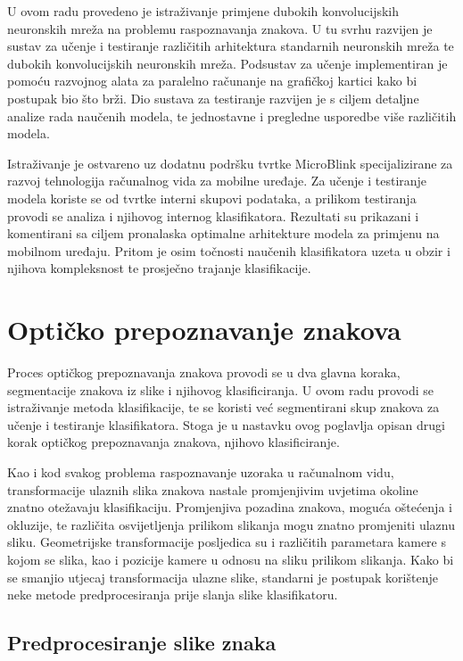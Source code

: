 \documentclass[lmodern, utf8, diplomski, numeric]{fer}
\begin{document}
U ovom radu provedeno je istraživanje primjene dubokih konvolucijskih neuronskih mreža na problemu raspoznavanja znakova. U tu svrhu razvijen je sustav za učenje i testiranje različitih arhitektura standarnih neuronskih mreža te dubokih konvolucijskih neuronskih mreža. Podsustav za učenje implementiran je pomoću razvojnog alata za paralelno računanje na grafičkoj kartici kako bi postupak bio što brži. Dio sustava za testiranje razvijen je s ciljem detaljne analize rada naučenih modela, te jednostavne i pregledne usporedbe više različitih modela. 

Istraživanje je ostvareno uz dodatnu podršku tvrtke MicroBlink specijalizirane za razvoj tehnologija računalnog vida za mobilne uređaje. Za učenje i testiranje modela koriste se od tvrtke interni skupovi podataka, a prilikom testiranja provodi se analiza i njihovog internog klasifikatora. 
Rezultati su prikazani i komentirani sa ciljem pronalaska optimalne arhitekture modela za primjenu na mobilnom uređaju. Pritom je osim točnosti naučenih klasifikatora uzeta u obzir i njihova kompleksnost te prosječno trajanje klasifikacije.





\chapter{Optičko prepoznavanje znakova}

Proces optičkog prepoznavanja znakova provodi se u dva glavna koraka, segmentacije znakova iz slike i njihovog klasificiranja. U ovom radu provodi se istraživanje metoda klasifikacije, te se koristi već segmentirani skup znakova za učenje i testiranje klasifikatora. Stoga je u nastavku ovog poglavlja opisan drugi korak optičkog prepoznavanja znakova, njihovo klasificiranje.

Kao i kod svakog problema raspoznavanje uzoraka u računalnom vidu, transformacije ulaznih slika znakova nastale promjenjivim uvjetima okoline znatno otežavaju klasifikaciju. Promjenjiva pozadina znakova, moguća oštećenja i okluzije, te različita osvijetljenja prilikom slikanja mogu znatno promjeniti ulaznu sliku. Geometrijske transformacije posljedica su i različitih parametara kamere s kojom se slika, kao i pozicije kamere u odnosu na sliku prilikom slikanja.  
Kako bi se smanjio utjecaj transformacija ulazne slike, standarni je postupak korištenje neke metode predprocesiranja prije slanja slike klasifikatoru.

\section{Predprocesiranje slike znaka}
\end{document}
